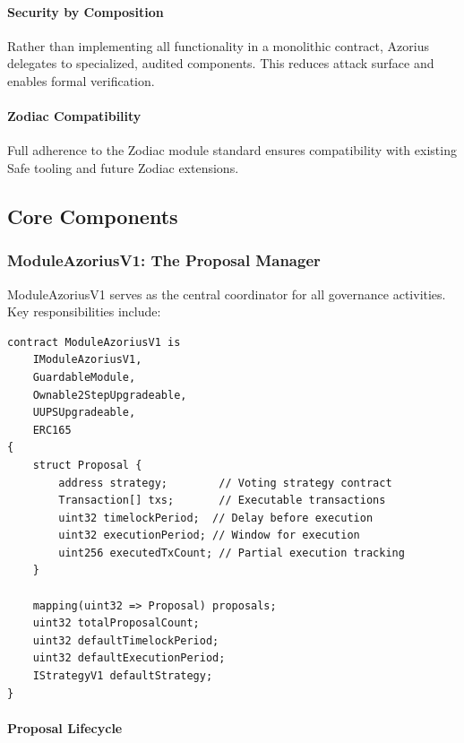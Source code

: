 \documentclass[11pt,a4paper]{article}
\begin{document}
\paragraph{Security by Composition} Rather than implementing all functionality in a monolithic contract, Azorius delegates to specialized, audited components. This reduces attack surface and enables formal verification.

\paragraph{Zodiac Compatibility} Full adherence to the Zodiac module standard ensures compatibility with existing Safe tooling and future Zodiac extensions.

\subsection{Core Components}

\subsubsection{ModuleAzoriusV1: The Proposal Manager}

ModuleAzoriusV1 serves as the central coordinator for all governance activities. Key responsibilities include:

\begin{lstlisting}[caption=ModuleAzoriusV1 Core Structure]
contract ModuleAzoriusV1 is
    IModuleAzoriusV1,
    GuardableModule,
    Ownable2StepUpgradeable,
    UUPSUpgradeable,
    ERC165
{
    struct Proposal {
        address strategy;        // Voting strategy contract
        Transaction[] txs;       // Executable transactions
        uint32 timelockPeriod;  // Delay before execution
        uint32 executionPeriod; // Window for execution
        uint256 executedTxCount; // Partial execution tracking
    }

    mapping(uint32 => Proposal) proposals;
    uint32 totalProposalCount;
    uint32 defaultTimelockPeriod;
    uint32 defaultExecutionPeriod;
    IStrategyV1 defaultStrategy;
}
\end{lstlisting}

\paragraph{Proposal Lifecycle}
\end{document}
